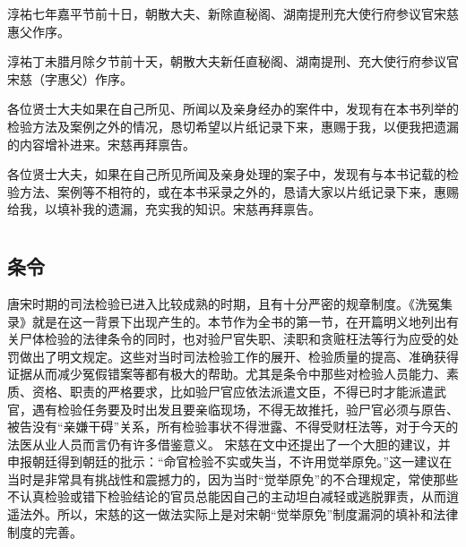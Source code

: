 \documentclass[12pt,UTF8]{ctexbook}
\begin{document}
淳祐七年嘉平节前十日，朝散大夫、新除直秘阁、湖南提刑充大使行府参议官宋慈惠父作序。

淳祐丁未腊月除夕节前十天，朝散大夫新任直秘阁、湖南提刑、充大使行府参议官宋慈（字惠父）作序。

各位贤士大夫如果在自己所见、所闻以及亲身经办的案件中，发现有在本书列举的检验方法及案例之外的情况，恳切希望以片纸记录下来，惠赐于我，以便我把遗漏的内容增补进来。宋慈再拜禀告。

各位贤士大夫，如果在自己所见所闻及亲身处理的案子中，发现有与本书记载的检验方法、案例等不相符的，或在本书采录之外的，恳请大家以片纸记录下来，惠赐给我，以填补我的遗漏，充实我的知识。宋慈再拜禀告。

\mainmatter

\part{}

\chapter{条令}

唐宋时期的司法检验已进入比较成熟的时期，且有十分严密的规章制度。《洗冤集录》就是在这一背景下出现产生的。本节作为全书的第一节，在开篇明义地列出有关尸体检验的法律条令的同时，也对验尸官失职、渎职和贪赃枉法等行为应受的处罚做出了明文规定。这些对当时司法检验工作的展开、检验质量的提高、准确获得证据从而减少冤假错案等都有极大的帮助。尤其是条令中那些对检验人员能力、素质、资格、职责的严格要求，比如验尸官应依法派遣文臣，不得已时才能派遣武官，遇有检验任务要及时出发且要亲临现场，不得无故推托，验尸官必须与原告、被告没有“亲嫌干碍”关系，所有检验事状不得泄露、不得受财枉法等，对于今天的法医从业人员而言仍有许多借鉴意义。
宋慈在文中还提出了一个大胆的建议，并申报朝廷得到朝廷的批示：“命官检验不实或失当，不许用觉举原免。”这一建议在当时是非常具有挑战性和震撼力的，因为当时“觉举原免”的不合理规定，常使那些不认真检验或错下检验结论的官员总能因自己的主动坦白减轻或逃脱罪责，从而逍遥法外。所以，宋慈的这一做法实际上是对宋朝“觉举原免”制度漏洞的填补和法律制度的完善。
\end{document}
